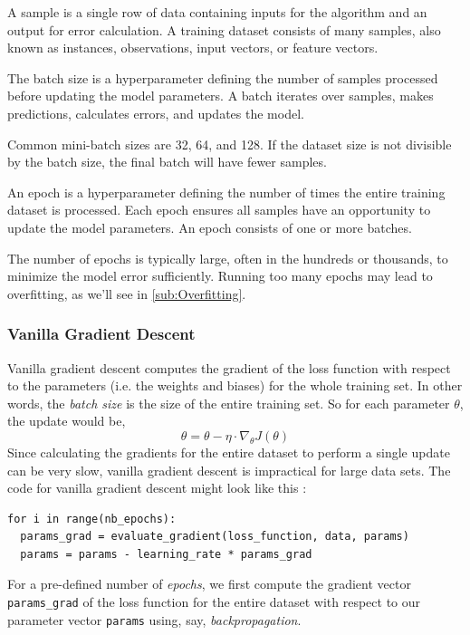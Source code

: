 \documentclass{article}
\begin{document}
\begin{definition}[Sample]
  A sample is a single row of data containing inputs for the algorithm and an output for error calculation. A training dataset consists of many samples, also known as instances, observations, input vectors, or feature vectors.
\end{definition}
\begin{definition}[Batch]
  The batch size is a hyperparameter defining the number of samples processed before updating the model parameters. A batch iterates over samples, makes predictions, calculates errors, and updates the model. 
\end{definition}

Common mini-batch sizes are 32, 64, and 128. If the dataset size is not divisible by the batch size, the final batch will have fewer samples.
\begin{definition}[Epoch]
  An epoch is a hyperparameter defining the number of times the entire training dataset is processed. Each epoch ensures all samples have an opportunity to update the model parameters. An epoch consists of one or more batches.
\end{definition}
   The number of epochs is typically large, often in the hundreds or thousands, to minimize the model error sufficiently. Running too many epochs may lead to overfitting, as we'll see in \autoref{sub:Overfitting}.

   \subsubsection{Vanilla Gradient Descent}
  \label{subsub:Vanilla Gradient Descent}
Vanilla gradient descent computes the gradient of the loss function with respect to the parameters (i.e. the weights and biases) for the whole training set. In other words, the \textit{batch size} is the size of the entire training set. So for each parameter $\theta$, the update would be, 
   $$ \theta =\theta - \eta \cdot \nabla_{\theta}J(\theta) $$
Since calculating the gradients for the entire dataset to perform a single update can be very slow, vanilla gradient descent is impractical for large data sets. The code for vanilla gradient descent might look like this \citep{ruder2017overview}:
\begin{verbatim}
for i in range(nb_epochs):
  params_grad = evaluate_gradient(loss_function, data, params)
  params = params - learning_rate * params_grad
\end{verbatim}
For a pre-defined number of \textit{epochs}, we first compute the gradient vector \texttt{params\_grad} of the loss function for the entire dataset with respect to our parameter vector \texttt{params} using, say, \textit{backpropagation}. 
\end{document}
